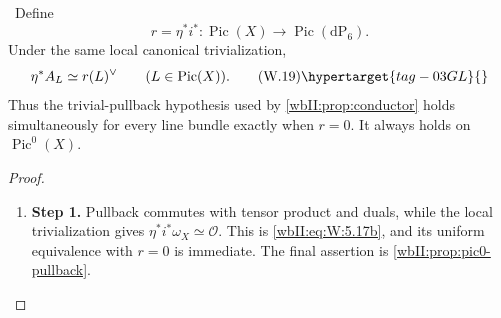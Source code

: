 \begin{proposition}
\hypertarget{tag-03IG}{}\label{wbII:prop:all-pic-restriction}

\ Define
\[
 r=\eta^*i^*:\operatorname{Pic}(X)\longrightarrow
 \operatorname{Pic}(\mathrm{dP}_6).
\]
Under the same local canonical trivialization,
\[
 \eta^*A_L\simeq r(L)^\vee
 \qquad(L\in\operatorname{Pic}(X)).
\tag{W.19}\hypertarget{tag-03GL}{}\label{wbII:eq:W:5.17b}
\]
Thus the trivial-pullback hypothesis used by
\cref{wbII:prop:conductor} holds simultaneously for every line bundle exactly
when $r=0$.  It always holds on $\operatorname{Pic}^0(X)$.
\end{proposition}



\begin{proof}
\begin{enumerate}[label={$\langle1\rangle$\arabic*.},leftmargin=*]
\item 
\noindent\textbf{Step 1.} Pullback commutes with tensor product and duals, while the local
trivialization gives $\eta^*i^*\omega_X\simeq\mathcal O$.  This is \eqref{wbII:eq:W:5.17b},
and its uniform equivalence with $r=0$ is immediate.  The final assertion is
\cref{wbII:prop:pic0-pullback}.

\end{enumerate}
\end{proof}